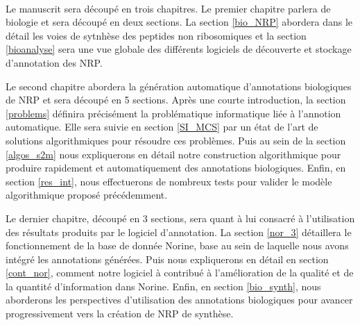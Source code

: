 ~~

Le manuscrit sera découpé en trois chapitres.
Le premier chapitre parlera de biologie et sera découpé en deux sections.
La section \ref{bio_NRP} abordera dans le détail les voies de sytnhèse des peptides non ribosomiques et la section \ref{bioanalyse} sera une vue globale des différents logiciels de découverte et stockage d'annotation des NRP.

Le second chapitre abordera la génération automatique d'annotations biologiques de NRP et sera découpé en 5 sections.
Après une courte introduction, la section \ref{problems} définira précisément la problématique informatique liée à l'annotion automatique.
Elle sera suivie en section \ref{SI_MCS} par un état de l'art de solutions algorithmiques pour résoudre ces problèmes.
Puis au sein de la section \ref{algos_s2m} nous expliquerons en détail notre construction algorithmique pour produire rapidement et automatiquement des annotations biologiques.
Enfin, en section \ref{res_int}, nous effectuerons de nombreux tests pour valider le modèle algorithmique proposé précédemment.

Le dernier chapitre, découpé en 3 sections, sera quant à lui consacré à l'utilisation des résultats produits par le logiciel d'annotation.
La section \ref{nor_3} détaillera le fonctionnement de la base de donnée Norine, base au sein de laquelle nous avons intégré les annotations générées.
Puis nous expliquerons en détail en section \ref{cont_nor}, comment notre logiciel à contribué à l'amélioration de la qualité et de la quantité d'information dans Norine.
Enfin, en section \ref{bio_synth}, nous aborderons les perspectives d'utilisation des annotations biologiques pour avancer progressivement vers la création de NRP de synthèse.